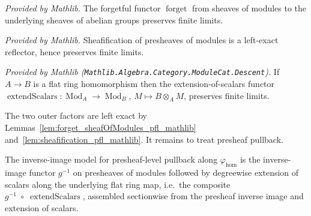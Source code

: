 \begin{lemma}
  \label{lem:forget_sheafOfModules_pfl_mathlib}
  \mathlibok
  \textit{Provided by Mathlib.}
  The forgetful functor \(\operatorname{forget}\) from sheaves of modules to the
  underlying sheaves of abelian groups preserves finite limits.
\end{lemma}

\begin{lemma}
  \label{lem:sheafification_pfl_mathlib}
  \mathlibok
  \textit{Provided by Mathlib.}
  Sheafification of presheaves of modules is a left-exact reflector, hence preserves
  finite limits.
\end{lemma}

\begin{lemma}
  \label{lem:extendScalars_pfl_flat_mathlib}
  \mathlibok
  \textit{Provided by Mathlib (\texttt{Mathlib.Algebra.Category.ModuleCat.Descent}).}
  If \(A \to B\) is a flat ring homomorphism then the extension-of-scalars functor
  \(\operatorname{extendScalars} : \operatorname{Mod}_A \to \operatorname{Mod}_B\),
  \(M \mapsto B \otimes_A M\), preserves finite limits.
\end{lemma}

The two outer factors are left exact by
Lemmas~\ref{lem:forget_sheafOfModules_pfl_mathlib}
and~\ref{lem:sheafification_pfl_mathlib}. It remains to treat presheaf pullback.

\begin{definition}
  \label{def:presheaf_pullback_inverseImage_model}
  The inverse-image model for presheaf-level pullback along \(\varphi_{\mathrm{hom}}\) is
  the inverse-image functor \(g^{-1}\) on presheaves of modules followed by degreewise
  extension of scalars along the underlying flat ring map, i.e.\ the composite
  \(g^{-1} \;\circ\; \operatorname{extendScalars}\), assembled sectionwise from the
  presheaf inverse image and extension of scalars.
\end{definition}

